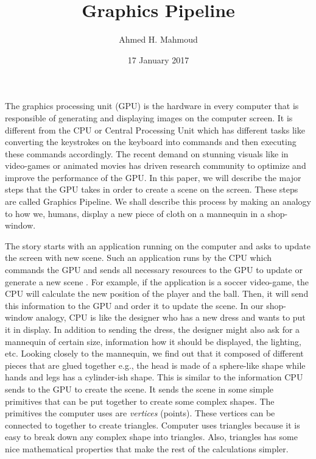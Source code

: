 \documentclass[12pt] {article}
\begin{document}
\title{Graphics Pipeline}
\author{Ahmed H. Mahmoud}
\date{17 January 2017} 

\maketitle
The graphics processing unit (GPU) is the hardware in every computer that is responsible of generating and displaying images on the computer screen. It is different from the CPU or Central Processing Unit which has different tasks like converting the keystrokes on the keyboard into commands and then executing these commands accordingly. The recent demand on stunning visuals like in video-games or animated movies has driven research community to optimize and improve the performance of the GPU. In this paper, we will describe the major steps that the GPU takes in order to create a scene on the screen. These steps are called Graphics Pipeline. We shall describe this process by making an analogy to how we, humans, display a new piece of cloth on a mannequin in a shop-window. 

The story starts with an application running on the computer and asks to update the screen with new scene. Such an application runs by the CPU which commands the GPU and sends all necessary resources to the GPU to update or generate a new scene \cite{wei2005crash}. For example, if the application is a soccer video-game, the CPU will calculate the new position of the player and the ball. Then, it will send this information to the GPU and order it to update the scene. In our shop-window analogy, CPU is like the designer who has a new dress and wants to put it in display. In addition to sending the dress, the designer might also ask  for a mannequin of certain size, information how it should be displayed, the lighting, etc. Looking closely to the mannequin, we find out that it composed of different pieces that are glued together e.g., the head is made of a sphere-like shape while hands and legs has a cylinder-ish shape. This is similar to the information CPU sends to the GPU to create the scene. It sends the scene in some simple primitives that can be put together to create some complex shapes. The primitives the computer uses are \emph{vertices} (points). These vertices can be connected to together to create triangles. Computer uses triangles because it is easy to break down any complex shape into triangles. Also, triangles has some nice mathematical properties that make the rest of the calculations simpler. 
\end{document}
